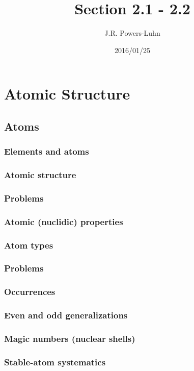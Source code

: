 \documentclass{article}
\author{J.R. Powers-Luhn}
\date{2016/01/25}
\title{Section 2.1 - 2.2}
\begin{document}
\section{Atomic Structure}

\subsection{Atoms}

\subsubsection{Elements and atoms}

\subsubsection{Atomic structure}

\subsubsection{Problems}

\subsubsection{Atomic (nuclidic) properties}

\subsubsection{Atom types}

\subsubsection{Problems}

\subsubsection{Occurrences}

\subsubsection{Even and odd generalizations}

\subsubsection{Magic numbers (nuclear shells)}

\subsubsection{Stable-atom systematics}
\end{document}
